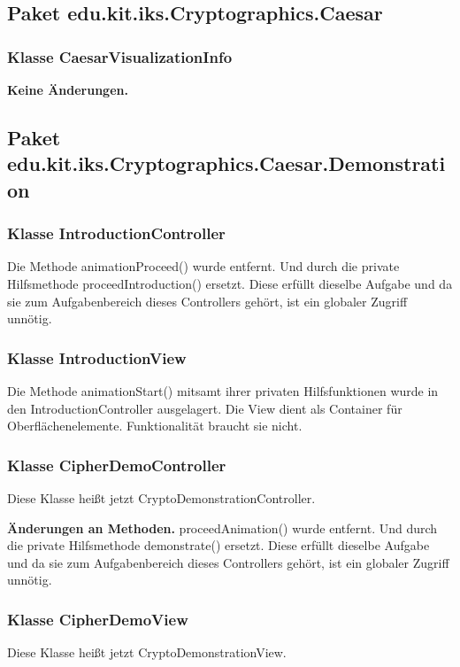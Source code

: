 \documentclass{article}
\begin{document}
  \subsection{Paket edu.kit.iks.Cryptographics.Caesar}
  
  	\subsubsection{Klasse CaesarVisualizationInfo}
  	 \textbf{Keine Änderungen.}

 	\subsection{Paket edu.kit.iks.Cryptographics.Caesar.Demonstration}
          
          \subsubsection{Klasse IntroductionController}
            Die Methode animationProceed() wurde entfernt. Und durch die private Hilfsmethode proceedIntroduction() ersetzt.
            Diese erfüllt dieselbe Aufgabe und da sie zum Aufgabenbereich dieses Controllers gehört, ist ein globaler Zugriff
            unnötig.
       	  \subsubsection{Klasse IntroductionView}
            Die Methode animationStart() mitsamt ihrer privaten Hilfsfunktionen wurde in den IntroductionController ausgelagert.
            Die View dient als Container für Oberflächenelemente. Funktionalität braucht sie nicht.
	  \subsubsection{Klasse CipherDemoController}
            Diese Klasse heißt jetzt CryptoDemonstrationController.\newline
         
           \textbf{Änderungen an Methoden.}\newline
            proceedAnimation() wurde entfernt. Und durch die private Hilfsmethode demonstrate() ersetzt.
            Diese erfüllt dieselbe Aufgabe und da sie zum Aufgabenbereich dieses Controllers gehört, 
            ist ein globaler Zugriff unnötig.

	\subsubsection{Klasse CipherDemoView}
	   Diese Klasse heißt jetzt CryptoDemonstrationView.\newline
	   
\end{document}
